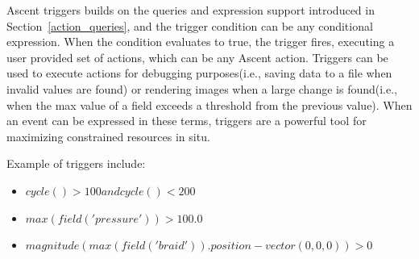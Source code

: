 Ascent triggers builds on the queries and expression support introduced in
Section~\ref{action_queries}, and the trigger condition can be any conditional
expression.
%
When the condition evaluates to true, the trigger fires, executing a user provided
set of actions, which can be any Ascent action.
%
Triggers can be used to execute actions for debugging purposes(i.e., saving data to
a file when invalid values are found) or rendering images when a large
change is found(i.e., when the max value of a field exceeds a threshold from the
previous value).
%
When an event can be expressed in these terms, triggers are a powerful tool for
maximizing constrained resources in situ.

Example of triggers include:
\begin{itemize}
\item $cycle() > 100 and cycle() < 200$
\item $max(field('pressure')) > 100.0$
\item $magnitude(max(field('braid')).position - vector(0,0,0)) > 0$
\end{itemize}
